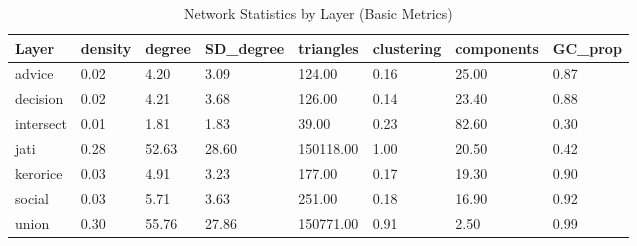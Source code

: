 \begin{table}
\centering
\caption{Network Statistics by Layer (Basic Metrics)}
\centering
\begin{tabular}[t]{llllllll}
\toprule
Layer & density & degree & SD\_degree & triangles & clustering & components & GC\_prop\\
\midrule
advice & 0.02 & 4.20 & 3.09 & 124.00 & 0.16 & 25.00 & 0.87\\
decision & 0.02 & 4.21 & 3.68 & 126.00 & 0.14 & 23.40 & 0.88\\
intersect & 0.01 & 1.81 & 1.83 & 39.00 & 0.23 & 82.60 & 0.30\\
jati & 0.28 & 52.63 & 28.60 & 150118.00 & 1.00 & 20.50 & 0.42\\
kerorice & 0.03 & 4.91 & 3.23 & 177.00 & 0.17 & 19.30 & 0.90\\
social & 0.03 & 5.71 & 3.63 & 251.00 & 0.18 & 16.90 & 0.92\\
union & 0.30 & 55.76 & 27.86 & 150771.00 & 0.91 & 2.50 & 0.99\\
\bottomrule
\end{tabular}
\end{table}
